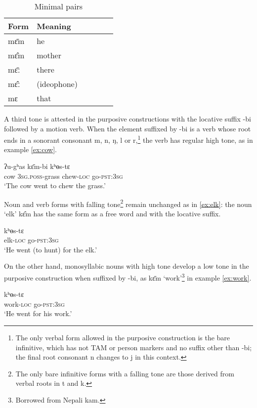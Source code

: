 \documentclass[oldfontcommands,oneside,a4paper,11pt]{article}
\newcommand{\ipa}[1]{{\phon \mbox{#1}}} %
\begin{document}
\begin{table}[H]
\caption{Minimal pairs} \label{tab:minimal.pairs}\centering
\begin{tabular}{llllll}
\toprule
Form & Meaning\\
\midrule
\ipa{mɛ̄m} & he \\
\ipa{mɛ̂m} & mother\\
\ipa{mɛ̄ː} & there\\
\ipa{mɛ̂ː} & (ideophone) \\
\ipa{mɛ} & that\\
\bottomrule
\end{tabular}
\end{table}

A third tone is attested in the purposive  constructions with the locative suffix \ipa{-bi} followed by a motion verb. When the element suffixed by \ipa{-bi} is a verb  whose root ends in a sonorant consonant \ipa{m}, \ipa{n}, \ipa{ŋ}, \ipa{l} or \ipa{r},\footnote{The only verbal form allowed in the purposive construction is the bare infinitive, which has not TAM or person markers and no suffix other than \ipa{-bi}; the final root consonant \ipa{n} changes to \ipa{j} in this context.} the verb has regular high tone, as in example \ref{ex:cow}.

\begin{exe}
\ex \label{ex:cow}
\gll \ipa{bʌ̂j} \ipa{ʔu-gʰas} \ipa{kɛ̄m-bi} \ipa{kʰɵs-tɛ}  \\
cow \textsc{3sg.poss}-grass chew-\textsc{loc} go-\textsc{pst:3sg} \\
\glt `The cow went to chew the grass.'
\end{exe}

Noun  and verb forms with falling tone\footnote{The only bare infinitive forms with a  falling tone are those derived from verbal roots in \ipa{t} and \ipa{k}.} remain unchanged as in \ref{ex:elk}: the noun `elk' \ipa{kɛ̂m} has the same form as a free word and with the locative suffix.

\begin{exe}
\ex \label{ex:elk}
\gll   \ipa{kɛ̂m-bi} \ipa{kʰɵs-tɛ}  \\
elk-\textsc{loc} go-\textsc{pst:3sg} \\
\glt `He went (to hunt) for the elk.'
\end{exe}


On the other hand, monosyllabic nouns with high tone develop a low tone in the purposive construction when suffixed by \ipa{-bi}, as \ipa{kɛ̄m}  `work'\footnote{Borrowed from Nepali \ipa{kam}.} in example \ref{ex:work}.
\begin{exe}
\ex \label{ex:work}
\gll   \ipa{kɛ̀m-bi} \ipa{kʰɵs-tɛ}  \\
work-\textsc{loc} go-\textsc{pst:3sg} \\
\glt `He went for his work.'
\end{exe}
\end{document}

